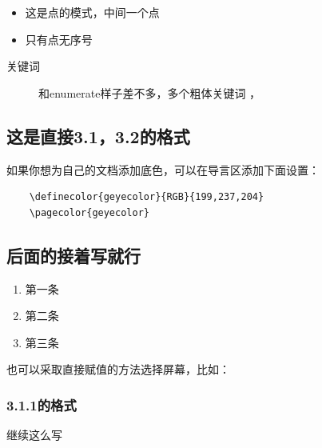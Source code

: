 \documentclass{article}
\begin{document}
\begin{itemize}  
    \item 这是点的模式，中间一个点
    \item 只有点无序号
\end{itemize}

\begin{description}
	\item[关键词] 和enumerate样子差不多，多个粗体关键词
	，
\end{description}
    
\subsection{这是直接3.1，3.2的格式}
  如果你想为自己的文档添加底色，可以在导言区添加下面设置：
  \begin{lstlisting}
    \definecolor{geyecolor}{RGB}{199,237,204}
    \pagecolor{geyecolor}
  \end{lstlisting}


\subsection{后面的接着写就行}
\begin{enumerate}
  \item 第一条
  \item 第二条
  \item 第三条
\end{enumerate}

也可以采取直接赋值的方法选择屏幕，比如：


\subsubsection{3.1.1的格式}
继续这么写
\end{document}
